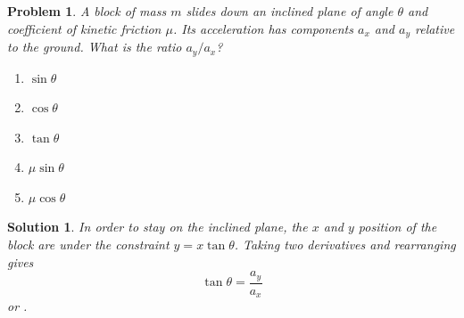 \documentclass[12pt]{article}
\newcommand{\clearpts}{\addtocounter{tpts}{\value{cpts}} \setcounter{cpts}{0}}
\newcommand{\pts}[1]{\clearpts \setcounter{cpts}{#1}}
\newtheorem*{solution}{Solution}
\theoremstyle{mystyle}
\newtheorem{pproblem}{Problem}
\begin{document}
\pts{2}
\begin{pproblem}
    A block of mass $m$ slides down an inclined plane of angle $\theta$ and coefficient of kinetic friction $\mu$.
    Its acceleration has components $a_x$ and $a_y$ relative to the ground.
    What is the ratio $a_y/a_x$?

    \begin{enumerate}[label=(\Alph*)]
        \item $\sin\theta$
        \item $\cos\theta$
        \item $\tan\theta$
        \item $\mu\sin\theta$
        \item $\mu\cos\theta$
    \end{enumerate}
\end{pproblem}

\begin{solution}
    In order to stay on the inclined plane, the $x$ and $y$ position
    of the block are under the constraint $y=x\tan\theta$. Taking
    two derivatives and rearranging gives \[
        \tan\theta=\dfrac{a_y}{a_x}
    \] or .
\end{solution}
\end{document}
